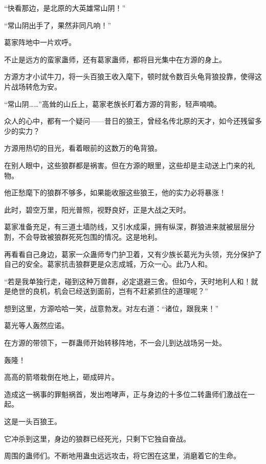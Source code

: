 
\begin{this_body}

“快看那边，是北原的大英雄常山阴！”

“常山阴出手了，果然非同凡响！”

葛家阵地中一片欢呼。

不止是远方的蛮家蛊师，还有葛家蛊师，都将目光集中在方源的身上。

方源方才小试牛刀，将一头百狼王收入麾下，顿时就令数百头龟背狼投靠，使得这片战场转危为安。

“常山阴……”高耸的山丘上，葛家老族长盯着方源的背影，轻声喃喃。

众人的心中，都有一个疑问——昔日的狼王，曾经名传北原的天才，如今还残留多少的实力？

方源用热切的目光，看着眼前的这数万的龟背狼。

在别人眼中，这些狼群都是祸害。但在方源的眼里，这些却是主动送上门来的礼物。

他正愁麾下的狼群不够多，如果能收服这些狼王，他的实力必将暴涨！

此时，碧空万里，阳光普照，视野良好，正是大战之天时。

葛家准备充足，有三道土墙防线，又引水成渠，拥有纵深，群狼进来就被层层分割，不会导致被狼群死死包围的情况。这是地利。

再看看自己身边，葛家一众蛊师专门护卫着，又有少族长葛光为头领，充分保护了自己的安全。葛家抗击狼群更是众志成城，万众一心。此乃人和。

“若是我单独行走，碰到这种万兽群，必定退避三舍。但如今，天时地利人和！就是绝世的良机，机会已经送到面前，岂有不赶紧抓住的道理呢？”

想到这里，方源哈哈一笑，战意勃发。对左右道：“诸位，跟我来！”

葛光等人轰然应诺。

在方源的带领下，一群蛊师开始转移阵地，不一会儿到达战场另一处。

轰隆！

高高的箭塔栽倒在地上，砸成碎片。

造成这一祸事的罪魁祸首，发出咆哮声，正与身边的十多位二转蛊师们激战在一起。

这是一头百狼王。

它冲杀到这里，身边的狼群已经死光，只剩下它独自奋战。

周围的蛊师们。不断地用蛊虫远远攻击，将它困在这里，消磨着它的生命。


\end{this_body}
